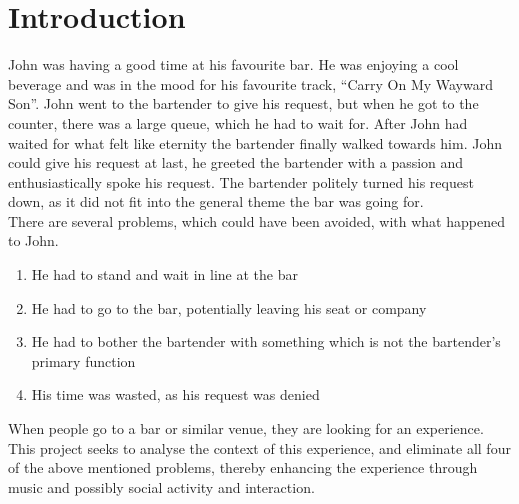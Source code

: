 \chapter{Introduction}
John was having a good time at his favourite bar. He was enjoying a cool beverage and was in the mood for his favourite track, \enquote{Carry On My Wayward Son}. John went to the bartender to give his request, but when he got to the counter, there was a large queue, which he had to wait for. After John had waited for what felt like eternity the bartender finally walked towards him. John could give his request at last, he greeted the bartender with a passion and enthusiastically spoke his request. The bartender politely turned his request down, as it did not fit into the general theme the bar was going for.\\

There are several problems, which could have been avoided, with what happened to John.
\begin{enumerate}
	\item He had to stand and wait in line at the bar
	\item He had to go to the bar, potentially leaving his seat or company
	\item He had to bother the bartender with something which is not the bartender's primary function
	\item His time was wasted, as his request was denied
\end{enumerate}

When people go to a bar or similar venue, they are looking for an experience.
This project seeks to analyse the context of this experience, and eliminate all four of the above mentioned problems, thereby enhancing the experience through music and possibly social activity and interaction.